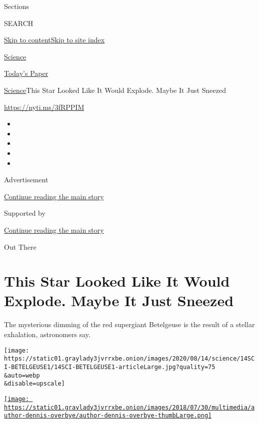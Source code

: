 Sections

SEARCH

\protect\hyperlink{site-content}{Skip to
content}\protect\hyperlink{site-index}{Skip to site index}

\href{https://www.nytimes3xbfgragh.onion/section/science}{Science}

\href{https://myaccount.nytimes3xbfgragh.onion/auth/login?response_type=cookie\&client_id=vi}{}

\href{https://www.nytimes3xbfgragh.onion/section/todayspaper}{Today's
Paper}

\href{/section/science}{Science}\textbar{}This Star Looked Like It Would
Explode. Maybe It Just Sneezed

\url{https://nyti.ms/3fRPPIM}

\begin{itemize}
\item
\item
\item
\item
\item
\end{itemize}

Advertisement

\protect\hyperlink{after-top}{Continue reading the main story}

Supported by

\protect\hyperlink{after-sponsor}{Continue reading the main story}

Out There

\hypertarget{this-star-looked-like-it-would-explode-maybe-it-just-sneezed}{%
\section{This Star Looked Like It Would Explode. Maybe It Just
Sneezed}\label{this-star-looked-like-it-would-explode-maybe-it-just-sneezed}}

The mysterious dimming of the red supergiant Betelgeuse is the result of
a stellar exhalation, astronomers say.

\texttt{[image: https://static01.graylady3jvrrxbe.onion/images/2020/08/14/science/14SCI-BETELGEUSE1/14SCI-BETELGEUSE1-articleLarge.jpg?quality=75\\\&auto=webp\\\&disable=upscale]}

\href{https://www.nytimes3xbfgragh.onion/by/dennis-overbye}{\texttt{[image: https://static01.graylady3jvrrxbe.onion/images/2018/07/30/multimedia/author-dennis-overbye/author-dennis-overbye-thumbLarge.png]}}

